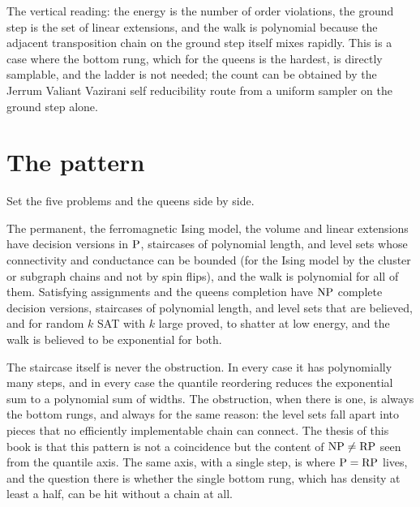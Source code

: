 The vertical reading: the energy is the number of order violations, the ground step is the set of linear extensions, and the walk is polynomial because the adjacent transposition chain on the ground step itself mixes rapidly. This is a case where the bottom rung, which for the queens is the hardest, is directly samplable, and the ladder is not needed; the count can be obtained by the Jerrum Valiant Vazirani self reducibility route from a uniform sampler on the ground step alone.

\section{The pattern}

Set the five problems and the queens side by side.

The permanent, the ferromagnetic Ising model, the volume and linear extensions have decision versions in $\mathrm{P}$, staircases of polynomial length, and level sets whose connectivity and conductance can be bounded (for the Ising model by the cluster or subgraph chains and not by spin flips), and the walk is polynomial for all of them. Satisfying assignments and the queens completion have $\mathrm{NP}$ complete decision versions, staircases of polynomial length, and level sets that are believed, and for random $k$ SAT with $k$ large proved, to shatter at low energy, and the walk is believed to be exponential for both.

The staircase itself is never the obstruction. In every case it has polynomially many steps, and in every case the quantile reordering reduces the exponential sum to a polynomial sum of widths. The obstruction, when there is one, is always the bottom rungs, and always for the same reason: the level sets fall apart into pieces that no efficiently implementable chain can connect. The thesis of this book is that this pattern is not a coincidence but the content of $\mathrm{NP} \neq \mathrm{RP}$ seen from the quantile axis. The same axis, with a single step, is where $\mathrm{P} = \mathrm{RP}$ lives, and the question there is whether the single bottom rung, which has density at least a half, can be hit without a chain at all.
